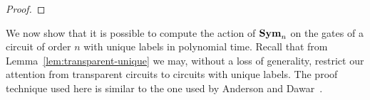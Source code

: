 \documentclass[../paper.tex]{subfiles}
\begin{document}
\begin{proof}
  

  

\end{proof}

We now show that it is possible to compute the action of $\text{\textbf{Sym}}_n$ on the gates
of a circuit of order $n$ with unique labels in polynomial time. Recall that
from Lemma~\ref{lem:transparent-unique} we may, without a loss of
generality, restrict our attention from transparent circuits to circuits with
unique labels. The proof technique used here is similar to the one used by
Anderson and Dawar~\cite{AndersonD17}.
\end{document}
